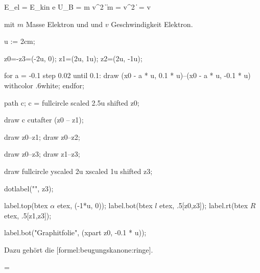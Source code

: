 \startformula 
\startalign[n=3]
\NC E_{el}                  \NC = E_{kin}                   \NC \NR
\NC e \cdot U_B             \NC =  m \cdot v^2   \NC \quad \|  \| \div m \NR
\NC {}         \NC = v^2                       \NC \quad \| \sqrt{} \NR
\NC {}  \NC = v                         \NC \NR
\stopalign
 \stopformula

mit $m$ Masse Elektron und und $v$ Geschwindigkeit Elektron.

\stopdefinition


\startMPpage

u := 2cm;

z0=-z3=(-2u, 0);
z1=(2u, 1u);
z2=(2u, -1u);

for a = -0.1 step 0.02 until 0.1:
	draw (x0 - a * u, 0.1 * u)--(x0 - a * u, -0.1 * u) withcolor .6white;
endfor;

path c;
c = fullcircle scaled 2.5u shifted z0;

draw c cutafter (z0 -- z1);

draw z0--z1;
draw z0--z2;

draw z0--z3;
draw z1--z3;

draw fullcircle yscaled 2u xscaled 1u shifted z3;

dotlabel("", z3);

label.top(btex $\alpha$ etex, (-1*u, 0));
label.bot(btex $l$ etex, .5[z0,z3]);
label.rt(btex $R$ etex, .5[z1,z3]);

label.bot("Graphitfolie", (xpart z0, -0.1 * u));


\stopMPpage

\stopbuffer



Dazu gehört die [formel:beugungskanone:ringe].

\startformula
\tan \alpha = 
\stopformula
\stopplaceformula


